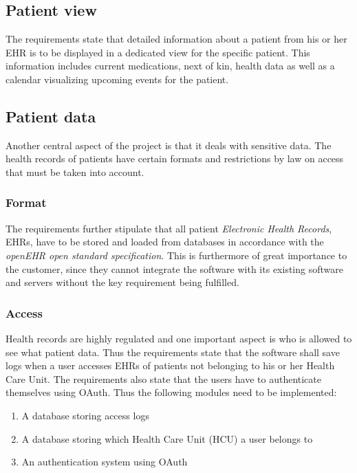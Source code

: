 \documentclass{article}
\begin{document}
\subsection{Patient view}
The requirements state that detailed information about a patient from his or her EHR is to be displayed in a dedicated view for the specific patient. This information includes current medications, next of kin, health data as well as a calendar visualizing upcoming events for the patient.

\subsection{Patient data}
Another central aspect of the project is that it deals with sensitive data. The health records of patients have certain formats and restrictions by law on access that must be taken into account.

\subsubsection{Format}
The requirements further stipulate that all patient \emph{Electronic Health Records}, EHRs, have to be stored and loaded from databases in accordance with the \emph{openEHR open standard specification}. This is furthermore of great importance to the customer, since they cannot integrate the software with its existing software and servers without the key requirement being fulfilled.

\subsubsection{Access}
Health records are highly regulated and one important aspect is who is allowed to see what patient data. Thus the requirements state that the software shall save logs when a user accesses EHRs of patients not belonging to his or her Health Care Unit. The requirements also state that the users have to authenticate themselves using OAuth. 
Thus the following modules need to be implemented:

\begin{enumerate}[label=(\roman*)]
\item A database storing access logs
\item A database storing which Health Care Unit (HCU) a user belongs to
\item An authentication system using OAuth
\end{enumerate}
\end{document}
